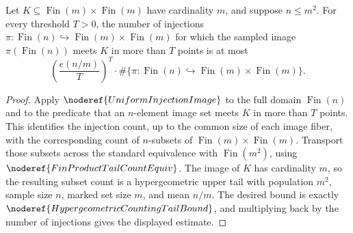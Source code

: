\begin{lemma}
Let \(K\subseteq \operatorname{Fin}(m)\times \operatorname{Fin}(m)\) have
cardinality \(m\), and suppose \(n\le m^2\).  For every threshold \(T>0\),
the number of injections \(\pi:\operatorname{Fin}(n)\hookrightarrow
\operatorname{Fin}(m)\times\operatorname{Fin}(m)\) for which the sampled image
\(\pi(\operatorname{Fin}(n))\) meets \(K\) in more than \(T\) points is at most
\[
\left(\frac{e(n/m)}{T}\right)^T
\cdot
\#\{\pi:\operatorname{Fin}(n)\hookrightarrow
\operatorname{Fin}(m)\times\operatorname{Fin}(m)\}.
\]
\end{lemma}
\begin{proof}
Apply \(\noderef{UniformInjectionImage}\) to the full domain
\(\operatorname{Fin}(n)\) and to the predicate that an \(n\)-element image set
meets \(K\) in more than \(T\) points.  This identifies the injection count,
up to the common size of each image fiber, with the corresponding count of
\(n\)-subsets of \(\operatorname{Fin}(m)\times\operatorname{Fin}(m)\).
Transport those subsets across the standard equivalence with
\(\operatorname{Fin}(m^2)\), using \(\noderef{FinProductTailCountEquiv}\).
The image of \(K\) has cardinality \(m\), so the resulting subset count is a
hypergeometric upper tail with population \(m^2\), sample size \(n\), marked
set size \(m\), and mean \(n/m\).  The desired bound is exactly
\(\noderef{HypergeometricCountingTailBound}\), and multiplying back by the
number of injections gives the displayed estimate.
\end{proof}
